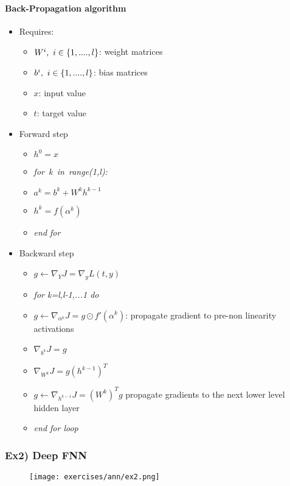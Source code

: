 \paragraph{Back-Propagation algorithm}
\begin{itemize}
\item Requires:
	\begin{itemize}
	\item $W^i,\ i\in \lbrace{1,....,l}\rbrace$: weight matrices
	\item $b^i,\ i\in \lbrace{1,....,l}\rbrace$: bias matrices
	\item $x$: input value
	\item $t$: target value
	\end{itemize}
\item Forward step

\begin{itemize}
\item $h^0=x$
\item \textit{for\ k\ in\ range(1,l):}
\item $a^k=b^k+W^kh^{k-1}$
\item $h^k=f(\alpha^k)$
\item \textit{end for}
\end{itemize}

\item Backward step

\begin{itemize}
	\item $g \leftarrow \nabla_YJ=\nabla_yL(t,y)$
	\item \textit{for k=l,l-1,...1 do}
	\item $g \leftarrow \nabla_{\alpha^k}J=g \odot f' (\alpha^k)$: propagate gradient to pre-non linearity activations
	\item $\nabla_{b^k}J=g$
	\item $\nabla_{W^k}J=g(h^{k-1})^T$
	\item $g \leftarrow \nabla_{h^{k-1}}J=(W^k)^Tg$ propagate gradients to the next lower level hidden layer
	\item \textit{end for loop}
\end{itemize}

\end{itemize}


\subsubsection{Ex2) Deep FNN}

\begin{figure}[H]
    \centering
    \texttt{[image: exercises/ann/ex2.png]}
\end{figure}


